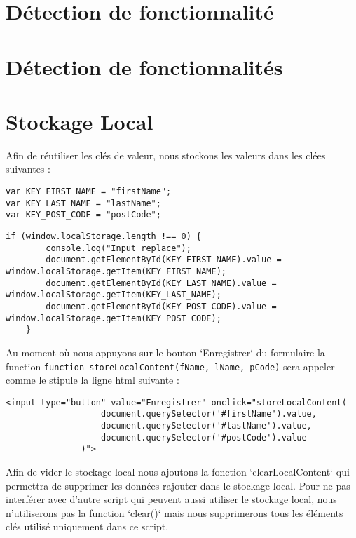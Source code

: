 \section{Détection de fonctionnalité} %

\section{Détection de fonctionnalités} %

\section{Stockage Local} %

Afin de réutiliser les clés de valeur, nous stockons les valeurs dans les clées suivantes :
\begin{verbatim}
var KEY_FIRST_NAME = "firstName";
var KEY_LAST_NAME = "lastName";
var KEY_POST_CODE = "postCode";
\end{verbatim}

\begin{verbatim}
if (window.localStorage.length !== 0) {
        console.log("Input replace");
        document.getElementById(KEY_FIRST_NAME).value = window.localStorage.getItem(KEY_FIRST_NAME);
        document.getElementById(KEY_LAST_NAME).value = window.localStorage.getItem(KEY_LAST_NAME);
        document.getElementById(KEY_POST_CODE).value = window.localStorage.getItem(KEY_POST_CODE);
    }
\end{verbatim}

Au moment où nous appuyons sur le bouton `Enregistrer` du formulaire la function \texttt{function storeLocalContent(fName, lName, pCode)} sera appeler comme le stipule la ligne html suivante :
\begin{verbatim}
<input type="button" value="Enregistrer" onclick="storeLocalContent(
                   document.querySelector('#firstName').value,
                   document.querySelector('#lastName').value,
                   document.querySelector('#postCode').value
               )">
\end{verbatim}


Afin de vider le stockage local nous ajoutons la fonction `clearLocalContent` qui permettra de supprimer les données rajouter dans le stockage local.
Pour ne pas interférer avec d'autre script qui peuvent aussi utiliser le stockage local, nous n'utiliserons pas la function `clear()` mais nous supprimerons tous les éléments clés utilisé uniquement dans ce script.

